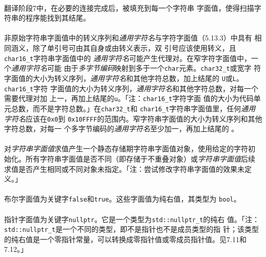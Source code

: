 \paragraph{}
翻译阶段7中，在必要的连接完成后，\texttt{\qsgl{}\qsgl}被填充到每一个字符串
字面值，使得扫描字符串的程序能找到其结尾。

\paragraph{}
非原始字符串字面值中的转义序列和\textit{通用字符名}与字符字面值（5.13.3）中具有
相同涵义，除了单引号\texttt{\qsgl}可由其自身或由转义\texttt{\bslh\qsgl}表示，双
引号应该使用\textit{\bslh}转义，且\texttt{char16\_t}字符串字面值中的
\textit{通用字符名}可能产生代理对。在窄字符字面值中，一个\textit{通用字符名}可能
由于\textit{多字节编码}映射到多于一个\texttt{char}元素。\texttt{char32\_t}或宽字
符字面值的大小为转义序列，\textit{通用字符名}和其他字符总数，加上结尾的
\texttt{U\qsgl{}\qsgl}或\texttt{L\qsgl{}\qsgl}。\texttt{char16\_t}字符
字面值的大小为转义序列，\textit{通用字符名}和其他字符总数，对每一个需要代理对加
上一，再加上结尾的\texttt{u\qsgl{}\qsgl}。「注：\texttt{char16\_t}字符字面
值的大小为代码单元总数，而不是字符总数。」在\texttt{char32\_t}和
\texttt{char16\_t}字符串字面值里，任何\textit{通用字符名}应该在\texttt{0x0}到
\texttt{0x10FFFF}的范围内。窄字符串字面值的大小为转义序列和其他字符总数，对每一
个多字节编码的\textit{通用字符名}至少加一，再加上结尾的
\texttt{\qsgl{}\qsgl}。

\paragraph{}
对\textit{字符串字面值}求值产生一个静态存储期字符串字面值对象，使用给定的字符初
始化。所有字符串字面值是否不同（即存储于不重叠对象）或\textit{字符串字面值}后续
求值是否产生相同或不同对象未指定。「注：尝试修改字符串字面值的效果未定义。」


\paragraph{}
布尔字面值为关键字\texttt{false}和\texttt{true}。这些字面值为纯右值，其类型为
\texttt{bool}。


\paragraph{}
指针字面值为关键字\texttt{nullptr}。它是一个类型为\texttt{std::nullptr\_t}的纯右
值。「注：\texttt{std::nullptr\_t}是一个不同的类型，即不是指针也不是成员类型的指
针；该类型的纯右值是一个零指针常量，可以转换成零指针值或零成员指针值。见7.11和
7.12。」

